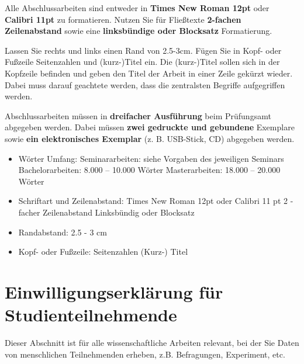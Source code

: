 \documentclass[
  letterpaper,
  DIV=11]{scrreprt}
\begin{document}
Alle Abschlussarbeiten sind entweder in \textbf{Times New Roman 12pt}
oder \textbf{Calibri 11pt} zu formatieren. Nutzen Sie für Fließtexte
\textbf{2-fachen Zeilenabstand} sowie eine \textbf{linksbündige oder
Blocksatz} Formatierung.

Lassen Sie rechts und links einen Rand von 2.5-3cm. Fügen Sie in Kopf-
oder Fußzeile Seitenzahlen und (kurz-)Titel ein. Die (kurz-)Titel sollen
sich in der Kopfzeile befinden und geben den Titel der Arbeit in einer
Zeile gekürzt wieder. Dabei muss darauf geachtete werden, dass die
zentralsten Begriffe aufgegriffen werden.

Abschlussarbeiten müssen in \textbf{dreifacher Ausführung} beim
Prüfungsamt abgegeben werden. Dabei müssen \textbf{zwei gedruckte und
gebundene} Exemplare sowie \textbf{ein elektronisches Exemplar} (z. B.
USB-Stick, CD) abgegeben werden.

\begin{tcolorbox}[enhanced jigsaw, left=2mm, rightrule=.15mm, bottomrule=.15mm, bottomtitle=1mm, colback=white, leftrule=.75mm, breakable, titlerule=0mm, toptitle=1mm, opacityback=0, opacitybacktitle=0.6, colbacktitle=quarto-callout-note-color!10!white, colframe=quarto-callout-note-color-frame, arc=.35mm, toprule=.15mm, coltitle=black, title=\textcolor{quarto-callout-note-color}{\faInfo}\hspace{0.5em}{Checkliste Formalien}]

\begin{itemize}
\item
  Wörter Umfang: Seminararbeiten: siehe Vorgaben des jeweiligen Seminars
  Bachelorarbeiten: 8.000 -- 10.000 Wörter Masterarbeiten: 18.000 --
  20.000 Wörter
\item
  Schriftart und Zeilenabstand: Times New Roman 12pt oder Calibri 11 pt
  2 - facher Zeilenabstand Linksbündig oder Blocksatz
\item
  Randabstand: 2.5 - 3 cm
\item
  Kopf- oder Fußzeile: Seitenzahlen (Kurz-) Titel
\end{itemize}

\end{tcolorbox}

\section{Einwilligungserklärung für
Studienteilnehmende}\label{einwilligungserkluxe4rung-fuxfcr-studienteilnehmende}

Dieser Abschnitt ist für alle wissenschaftliche Arbeiten relevant, bei
der Sie Daten von menschlichen Teilnehmenden erheben, z.B. Befragungen,
Experiment, etc.
\end{document}
